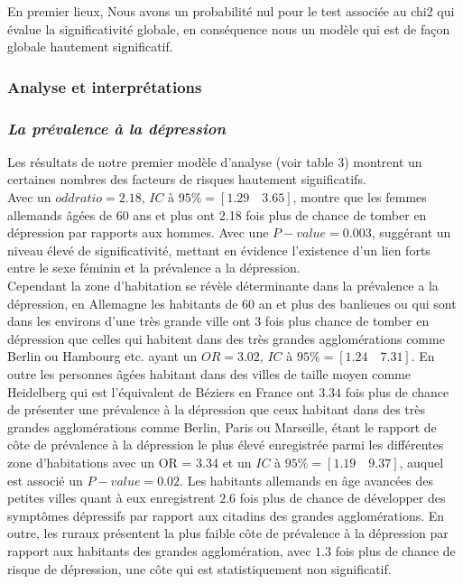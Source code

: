 \documentclass[a4paper]{article}
\begin{document}
En premier lieux, Nous avons un probabilité nul pour le test associée au chi2 qui évalue la significativité globale, en conséquence nous un modèle qui est de façon globale hautement significatif. 

\subsubsection{Analyse et interprétations} 

\subsubsection*{\textbf{\textit{La prévalence à la dépression}}}

Les résultats de notre premier modèle d'analyse (voir table 3) montrent un certaines nombres des facteurs de risques hautement significatifs.\\

Avec un $odd ratio = 2.18$, $IC$ à $95\%  = [1.29 \quad 3.65]$, montre que les femmes allemands âgées de 60 ans et plus ont 2.18 fois plus de chance de tomber en dépression par rapports aux hommes. Avec une  $P-value = 0.003$, suggérant un niveau élevé de significativité, mettant en évidence l’existence d’un lien forts entre le sexe féminin et la prévalence a la dépression.\\

Cependant la zone d’habitation  se révèle déterminante dans la prévalence a la dépression, en Allemagne les habitants de 60 an et plus des banlieues ou qui sont dans les environs d’une très grande ville ont 3 fois plus chance de tomber en dépression que celles qui habitent dans des très grandes agglomérations comme Berlin ou Hambourg etc. ayant un  $OR = 3.02$,  $IC$ à $95 \% = [1.24 \quad 7.31]$. En outre les personnes âgées habitant dans des villes de taille moyen comme Heidelberg qui est l’équivalent de Béziers en France ont $3.34$ fois plus de chance de présenter une prévalence à la dépression que ceux habitant dans des très grandes agglomérations comme Berlin, Paris ou Marseille, étant le rapport de côte de prévalence à la dépression le plus élevé enregistrée parmi les différentes zone d’habitations avec un OR = 3.34 et un $IC$ à $95 \%  = [1.19 \quad  9.37]$, auquel est associé un $P-value = 0.02$.  Les habitants allemands en âge avancées des petites villes quant à eux enregistrent $2.6$ fois plus de chance de développer des symptômes dépressifs par rapport aux citadins des grandes agglomérations. En outre, les ruraux présentent la plus faible côte de prévalence à la dépression par rapport aux habitants des grandes agglomération, avec $1.3$ fois plus de chance de risque de dépression, une côte qui est statistiquement non significatif.\\
\end{document}
